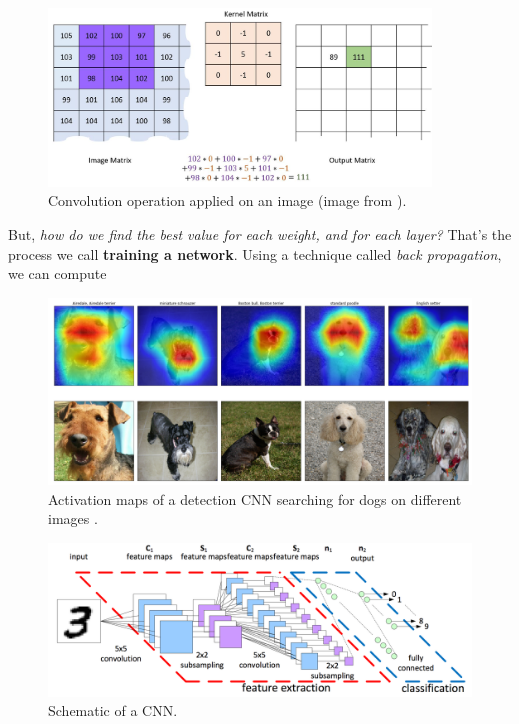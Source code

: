 \begin{figure}[h]
	\centering
	\includegraphics[width=4in]{images/convolution}
	\caption{Convolution operation applied on an image (image from \cite{image-convolution}).}
	\label{fig:1_convolution}
\end{figure}





But, \emph{how do we find the best value for each weight, and for each layer?} That's the process we call \textbf{training a network}. Using a technique called \emph{back propagation}, we can compute 

\begin{figure}[h]
	\centering
	\includegraphics[width=0.9\linewidth]{images/activation_maps}
	\caption{Activation maps of a detection CNN searching for dogs on different images \cite{activation-maps}.}
	\label{fig:1_activation_maps}
\end{figure}



\begin{figure}[h]
	\centering
	\includegraphics[width=0.9\linewidth]{images/cnn}
	\caption{Schematic of a CNN.}
	\label{fig:1_cnn}
\end{figure}

